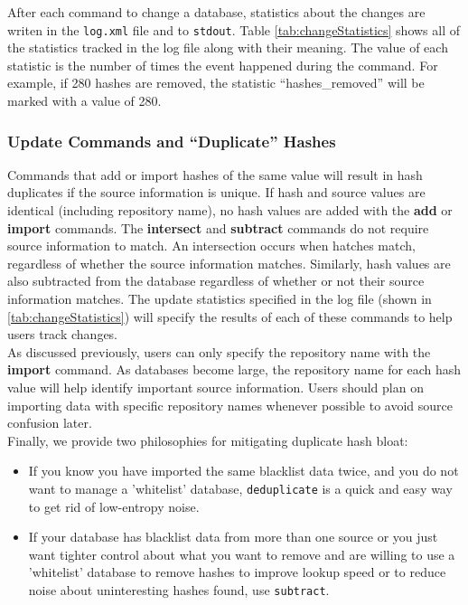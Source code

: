 \documentclass[11pt,fleqn]{article} %
\begin{document}
After each command to change a database, statistics about the changes are writen in the \texttt{log.xml} file and to \texttt{stdout}. Table \ref{tab:changeStatistics} shows all of the statistics tracked in the log file along with their meaning. The value of each statistic is the number of times the event happened during the command. For example, if 280 hashes are removed, the statistic ``hashes\_removed'' will be marked with a value of 280. \\

\subsubsection{Update Commands and ``Duplicate'' Hashes}
Commands that add or import hashes of the same value will result in hash duplicates if the source information is unique. If hash and source values are identical (including repository name), no hash values are added with the \textbf{add} or \textbf{import} commands. The \textbf{intersect} and \textbf{subtract} commands do not require source information to match. An intersection occurs when hatches match, regardless of whether the source information matches. Similarly, hash values are also subtracted from the database regardless of whether or not their source information matches.  The update statistics specified in the log file (shown in \ref{tab:changeStatistics}) will specify the results of each of these commands to help users track changes. \\

As discussed previously, users can only specify the repository name with the \textbf{import} command. As databases become large, the repository name for each hash value will help identify important source information. Users should plan on importing data with specific repository names whenever possible to avoid source confusion later.\\

Finally, we provide two philosophies for mitigating duplicate hash bloat:
\begin{itemize}
 \item If you know you have imported the same blacklist data twice,
  and you do not want to manage a 'whitelist' database,
  \texttt{deduplicate} is a quick and easy way to get rid of low-entropy noise.
  \item If your database has blacklist data from more than one source
  or you just want tighter control about what you want to remove
  and are willing to use a 'whitelist' database
  to remove hashes to improve lookup speed
  or to reduce noise about uninteresting hashes found,
  use \texttt{subtract}.
\end{itemize}
\end{document}
